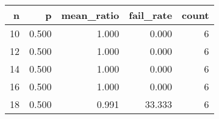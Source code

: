\begin{tabular}{rrrrr}
\toprule
n & p & mean\_ratio & fail\_rate & count \\
\midrule
10 & 0.500 & 1.000 & 0.000 & 6 \\
12 & 0.500 & 1.000 & 0.000 & 6 \\
14 & 0.500 & 1.000 & 0.000 & 6 \\
16 & 0.500 & 1.000 & 0.000 & 6 \\
18 & 0.500 & 0.991 & 33.333 & 6 \\
\bottomrule
\end{tabular}
